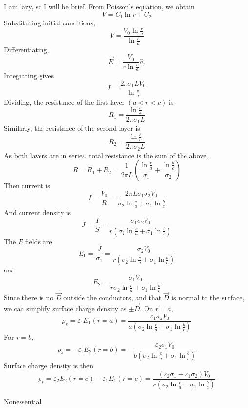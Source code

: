 \documentclass[answers]{exam}
\begin{document}
\begin{questions}
\begin{solution}
	I am lazy, so I will be brief. From Poisson's equation, we obtain
	$$V = C_1\ln r + C_2$$
	Substituting initial conditions,
	$$V = \frac{V_0\ln\frac{r}{a}}{\ln\frac{c}{a}}$$
	Differentiating,
	$$\vec E = \frac{V_0}{r\ln\frac{c}{a}} \hat a_r$$
	Integrating gives
	$$I = \frac{2\pi\sigma_1LV_0}{\ln\frac{c}{a}}$$
	Dividing, the resistance of the first layer $(a<r<c)$ is
	$$R_1 = \frac{\ln\frac{c}{a}}{2\pi\sigma_1L}$$
	Similarly, the resistance of the second layer is
	$$R_2 = \frac{\ln\frac{b}{c}}{2\pi\sigma_2L}$$
	As both layers are in series, total resistance is the sum of the above,
	$$R = R_1 + R_2 = \frac{1}{2\pi L}\left(\frac{\ln\frac{c}{a}}{\sigma_1} + \frac{\ln\frac{b}{c}}{\sigma_2}\right)$$
    Then current is
    $$I = \frac{V_0}{R} = \frac{2\pi L\sigma_1\sigma_2V_0}{\sigma_2\ln\frac{c}{a} + \sigma_1\ln\frac{b}{c}}$$
    And current density is
    $$J = \frac{I}{S} = \frac{\sigma_1\sigma_2V_0}{r\left(\sigma_2\ln\frac{c}{a} + \sigma_1\ln\frac{b}{c}\right)}$$
    The $E$ fields are
    $$E_1 = \frac{J}{\sigma_1} = \frac{\sigma_2V_0}{r\left(\sigma_2\ln\frac{c}{a} + \sigma_1\ln\frac{b}{c}\right)}$$
    and
    $$E_2 = \frac{\sigma_1V_0}{r\sigma_2\ln\frac{c}{a} + \sigma_1\ln\frac{b}{c}}$$
    Since there is no $\vec D$ outside the conductors, and that $\vec D$ is normal to the surface, we can simplify surface charge density as $\pm\vec D$. On $r=a$,
    $$\rho_s = \varepsilon_1E_1(r=a) = \frac{\varepsilon_1\sigma_2V_0}{a\left(\sigma_2\ln\frac{c}{a} + \sigma_1\ln\frac{b}{c}\right)}$$
    For $r=b$,
    $$\rho_s = -\varepsilon_2E_2(r=b) = -\frac{\varepsilon_2\sigma_1V_0}{b\left(\sigma_2\ln\frac{c}{a} + \sigma_1\ln\frac{b}{c}\right)}$$
    Surface charge density is then
    $$\rho_s = \varepsilon_2E_2(r=c) - \varepsilon_1E_1(r=c) = \frac{(\varepsilon_2\sigma_1-\varepsilon_1\sigma_2)V_0}{c\left(\sigma_2\ln\frac{c}{a} + \sigma_1\ln\frac{b}{c}\right)}$$
\end{solution}


\begin{solution}
    Nonessential.
\end{solution}


\end{questions}
\end{document}
